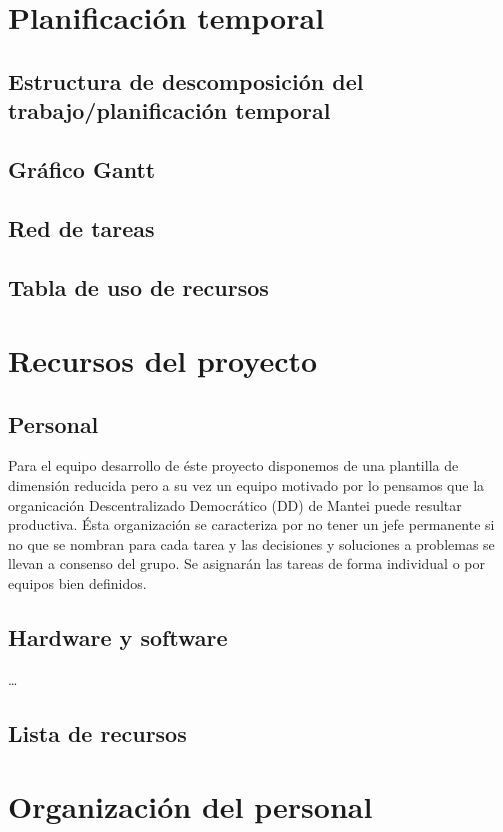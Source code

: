 \documentclass[11pt, a4paper, twoside]{report}
\begin{document}
	\section{Planificación temporal}		
		\subsection{Estructura de descomposición del trabajo/planificación temporal}
			 
		\subsection{Gráfico Gantt}
		\subsection{Red de tareas}
		\subsection{Tabla de uso de recursos}
	\section{Recursos del proyecto}
		\subsection{Personal}
		Para el equipo desarrollo de éste proyecto disponemos de una plantilla de dimensión reducida pero a su vez un equipo motivado por lo pensamos que la organicación Descentralizado Democrático (DD) de Mantei puede resultar productiva. Ésta organización se caracteriza por no tener un jefe permanente si no que se nombran para cada tarea y las decisiones y soluciones a problemas se llevan a consenso del grupo. Se asignarán las tareas de forma individual o por equipos bien definidos.

		\subsection{Hardware y software}
			\ldots

		\subsection{Lista de recursos}
			

	\section{Organización del personal}
\end{document}
